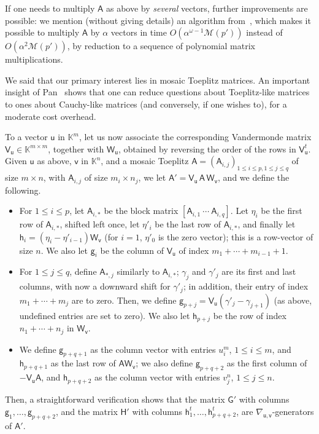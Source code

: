 \documentclass{sig-alternate}
\newcommand{\vg}{\ensuremath{\mathsf{g}}}
\newcommand{\vh}{\ensuremath{\mathsf{h}}}
\newcommand{\vu}{\ensuremath{\mathsf{u}}}
\newcommand{\vv}{\ensuremath{\mathsf{v}}}
\newcommand{\mA}{\ensuremath{\mathsf{A}}}
\newcommand{\mG}{\ensuremath{\mathsf{G}}}
\newcommand{\mH}{\ensuremath{\mathsf{H}}}
\newcommand{\mV}{\ensuremath{\mathsf{V}}}
\newcommand{\mW}{\ensuremath{\mathsf{W}}}
\newcommand{\K}{\ensuremath{\mathbb{K}}}
\newcommand{\M}{\ensuremath{\mathscr{M}}}
\begin{document}
If one needs to multiply $\mA$ as above by {\em several} vectors,
further improvements are possible: we mention (without giving details) 
an algorithm from~\cite{BoJeMoSc16}, which
makes it possible to multiply $\mA$ by $\alpha$ vectors in time 
 $O(\alpha^{\omega-1}
\M(p'))$ instead of $O(\alpha^2 \M(p'))$, by reduction to 
a sequence of polynomial matrix multiplications.

\smallskip{}
 We said that our primary interest lies in mosaic
Toep\-litz matrices. An important insight of Pan~\cite{Pan90} shows
that one can reduce questions about Toeplitz-like matrices to ones
about Cauchy-like matrices (and conversely, if one wishes to), for a
moderate cost overhead.

To a vector $\vu$ in $\K^m$, let us now associate the corresponding
Vandermonde matrix $\mV_\vu \in \K^{m\times m}$, together with
$\mW_\vu$, obtained by reversing the order of the rows in
$\mV^t_\vu$. Given $\vu$ as above, $\vv$ in $\K^n$, and a mosaic
Toeplitz $\mA=(\mA_{i,j})_{1 \le i \le p,1 \le j \le q}$ of size $m
\times n$, with $\mA_{i,j}$ of size $m_i \times n_j$, we let
$\mA' = \mV_\vu\, \mA\, \mW_\vv$, and we define the following.
\begin{itemize}
\item For $1 \le i \le p$, let $\mA_{i,*}$ be the block matrix
  $[\mA_{i,1}~\cdots~\mA_{i,q}]$.  Let $\eta_i$ be the first row of
  $\mA_{i,*}$, shifted left once, let $\eta'_i$ be the last row of
  $\mA_{i,*}$, and finally let $\vh_i=(\eta_i-\eta'_{i-1})\mW_\vv$
  (for $i=1$, $\eta'_0$ is the zero vector); this is a row-vector of
  size $n$.  We also let $\vg_{i}$ be the column of $\mV_\vu$ of index $m_1 +
  \cdots +m_{i-1}+1$.
  
\item For $1 \le j \le q$, define $\mA_{*,j}$ similarly to $\mA_{i,*}$; $\gamma_j$
  and $\gamma'_j$ are its first and last columns, with now a downward
  shift for $\gamma'_j$; in addition, their entry of index $m_1 +
  \cdots + m_j$ are to zero. Then, we define
  $\vg_{p+j}=\mV_\vu(\gamma'_{j}-\gamma_{j+1})$ (as above, undefined
  entries are set to zero).  We also let $\vh_{p+j}$ be 
  the row of  index $n_1 + \cdots
  +n_j$ in $\mW_\vv$.
\item We define $\vg_{p+q+1}$ as the column vector with entries $u_i^m$,
  $1 \le i \le m$, and $\vh_{p+q+1}$ as the last row of $\mA \mW_\vv$;
  we also define $\vg_{p+q+2}$ as the first column of $-\mV_\vu \mA$,
  and $\vh_{p+q+2}$ as the  column vector with entries $v_j^n$,  
  $1\le j \le n$.
\end{itemize}
Then, a straightforward verification shows that the matrix $\mG'$ with
columns $\vg_1,\dots,\vg_{p+q+2}$, and the matrix $\mH'$ with columns
$\vh^t_1,\dots,\vh^t_{p+q+2}$, are $\nabla_{\vu,\vv}$-generators of
$\mA'$.
\end{document}
